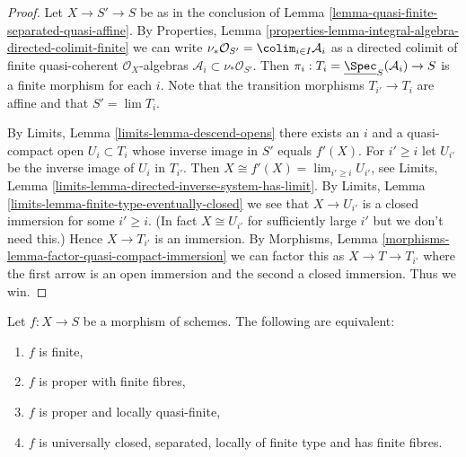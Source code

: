 \begin{proof}
Let $X \to S' \to S$ be as in the conclusion of
Lemma \ref{lemma-quasi-finite-separated-quasi-affine}.
By
Properties, Lemma
\ref{properties-lemma-integral-algebra-directed-colimit-finite}
we can write
$\nu_*\mathcal{O}_{S'} = \colim_{i \in I} \mathcal{A}_i$ as a
directed colimit of finite quasi-coherent $\mathcal{O}_X$-algebras
$\mathcal{A}_i \subset \nu_*\mathcal{O}_{S'}$. Then
$\pi_i : T_i = \underline{\Spec}_S(\mathcal{A}_i) \to S$
is a finite morphism for each $i$.
Note that the transition morphisms $T_{i'} \to T_i$ are affine
and that $S' = \lim T_i$.

\medskip\noindent
By Limits, Lemma \ref{limits-lemma-descend-opens}
there exists an $i$ and a quasi-compact open
$U_i \subset T_i$ whose inverse image in $S'$ equals
$f'(X)$. For $i' \geq i$ let $U_{i'}$ be the inverse image
of $U_i$ in $T_{i'}$. Then $X \cong f'(X) = \lim_{i' \geq i} U_{i'}$, see
Limits, Lemma \ref{limits-lemma-directed-inverse-system-has-limit}.
By Limits, Lemma \ref{limits-lemma-finite-type-eventually-closed} we see that
$X \to U_{i'}$ is a closed immersion for some $i' \geq i$.
(In fact $X \cong U_{i'}$ for sufficiently
large $i'$ but we don't need this.) Hence $X \to T_{i'}$ is an immersion. By
Morphisms, Lemma \ref{morphisms-lemma-factor-quasi-compact-immersion}
we can factor this as $X \to T \to T_{i'}$ where the first arrow
is an open immersion and the second a closed immersion. Thus we win.
\end{proof}

\begin{lemma}
\label{lemma-characterize-finite}
Let $f : X \to S$ be a morphism of schemes.
The following are equivalent:
\begin{enumerate}
\item $f$ is finite,
\item $f$ is proper with finite fibres,
\item $f$ is proper and locally quasi-finite,
\item $f$ is universally closed, separated, locally of finite type
and has finite fibres.
\end{enumerate}
\end{lemma}

